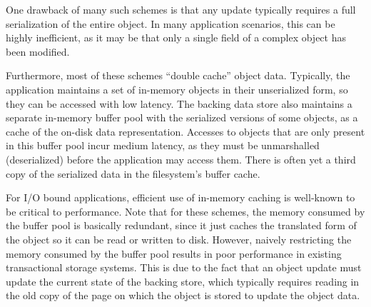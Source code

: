 \documentclass[letterpaper,twocolumn,english]{article}
\begin{document}
One drawback of many such schemes is that any update typically
requires a full serialization of the entire object. In many
application scenarios, this can be highly inefficient, as it may be
that only a single field of a complex object has been modified.

Furthermore, most of these schemes ``double cache'' object
data.  Typically, the application maintains a set of in-memory
objects in their unserialized form, so they can be accessed with low latency.
The backing data store also
maintains a separate in-memory buffer pool with the serialized versions of
some objects, as a cache of the on-disk data representation.
Accesses to objects that are only present in this buffer
pool incur medium latency, as they must be unmarshalled (deserialized)
before the application may access them. There is often yet a third
copy of the serialized data in the filesystem's buffer cache.



For I/O bound applications, efficient use of in-memory caching is
well-known to be critical to performance. Note that for these schemes,
the memory consumed by the buffer pool is basically redundant, since
it just caches the translated form of the object so it can be read or
written to disk. However, naively restricting the memory consumed by
the buffer pool results in poor performance in existing transactional
storage systems. This is due to the fact that an object update must
update the current state of the backing store, which typically
requires reading in the old copy of the page on which the object is
stored to update the object data.


\end{document}
